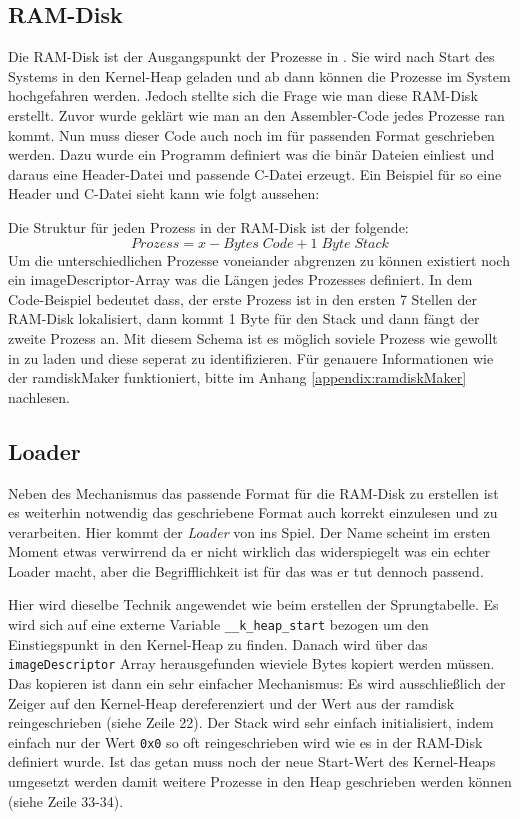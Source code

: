 \subsection{RAM-Disk}
Die RAM-Disk ist der Ausgangspunkt der Prozesse in \mops. Sie wird nach Start des Systems in den Kernel-Heap geladen und ab dann k\"onnen die Prozesse im System hochgefahren werden. Jedoch stellte sich die Frage wie man diese RAM-Disk erstellt. Zuvor wurde gekl\"art wie man an den Assembler-Code jedes Prozesse ran kommt. Nun muss dieser Code auch noch im f\"ur \mops passenden Format geschrieben werden. Dazu wurde ein Programm definiert was die bin\"ar Dateien einliest und daraus eine Header-Datei und passende C-Datei erzeugt. Ein Beispiel f\"ur so eine Header und C-Datei sieht kann wie folgt aussehen:

\newpage

Die Struktur f\"ur jeden Prozess in der RAM-Disk ist der folgende:
$$Prozess = x-Bytes\;Code + 1\;Byte\;Stack$$
Um die unterschiedlichen Prozesse voneiander abgrenzen zu k\"onnen existiert noch ein imageDescriptor-Array was die L\"angen jedes Prozesses definiert. In dem Code-Beispiel bedeutet dass, der erste Prozess ist in den ersten 7 Stellen der RAM-Disk lokalisiert, dann kommt 1 Byte f\"ur den Stack und dann f\"angt der zweite Prozess an. Mit diesem Schema ist es m\"oglich soviele Prozess wie gewollt in \mops zu laden und diese seperat zu identifizieren. F\"ur genauere Informationen wie der ramdiskMaker funktioniert, bitte im Anhang \ref{appendix:ramdiskMaker} nachlesen.
\subsection{\mops Loader}
Neben des Mechanismus das passende Format f\"ur die RAM-Disk zu erstellen ist es weiterhin notwendig das geschriebene Format auch korrekt einzulesen und zu verarbeiten. Hier kommt der \textit{Loader} von \mops ins Spiel. Der Name scheint im ersten Moment etwas verwirrend da er nicht wirklich das widerspiegelt was ein echter Loader macht, aber die Begrifflichkeit ist f\"ur das was er tut dennoch passend. 

Hier wird dieselbe Technik angewendet wie beim erstellen der Sprungtabelle. Es wird sich auf eine externe Variable \texttt{\_\_k\_heap\_start} bezogen um den Einstiegspunkt in den Kernel-Heap zu finden. Danach wird \"uber das \texttt{imageDescriptor} Array herausgefunden wieviele Bytes kopiert werden m\"ussen. Das kopieren ist dann ein sehr einfacher Mechanismus: Es wird ausschlie\ss lich der Zeiger auf den Kernel-Heap dereferenziert und der Wert aus der ramdisk reingeschrieben (siehe Zeile 22). Der Stack wird sehr einfach initialisiert, indem einfach nur der Wert \texttt{0x0} so oft reingeschrieben wird wie es in der RAM-Disk definiert wurde. Ist das getan muss noch der neue Start-Wert des Kernel-Heaps umgesetzt werden damit weitere Prozesse in den Heap geschrieben werden k\"onnen (siehe Zeile 33-34).
